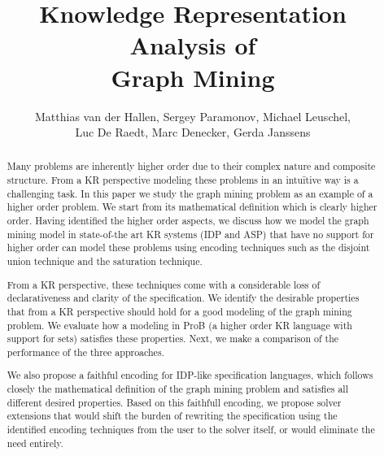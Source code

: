 \documentclass{new_tlp}
\author[]{Matthias van der Hallen, Sergey Paramonov, Michael Leuschel,\\ Luc De Raedt, Marc Denecker, Gerda Janssens}
\title{Knowledge Representation Analysis of\\ Graph Mining}
\begin{document}
\maketitle
\begin{abstract}
Many problems are inherently higher order due to their complex nature and composite structure. 
From a KR perspective modeling these problems in an intu\"itive way is a challenging task. 
In this paper we study the graph mining problem as an example of a higher order problem. 
We start from its mathematical definition which is clearly higher order. 
Having identified the higher order aspects, we discuss how we model the graph mining model 
in state-of-the art KR systems (IDP and ASP) that have no support for higher order can model these problems using encoding techniques such as the disjoint union technique and the saturation technique. 

From a KR perspective, these techniques come with a considerable loss of declarativeness and clarity of the specification. 
We identify the desirable properties that from a KR perspective should hold for a good modeling of the graph mining problem. 
We evaluate how a modeling in ProB (a higher order KR language with support for sets) satisfies these properties. 
Next, we make a comparison of the performance of the three approaches.

We also propose a faithful encoding for IDP-like specification languages, which follows closely the mathematical definition of the graph mining problem and satisfies all different desired properties.
Based on this faithfull encoding,  we propose solver extensions that would shift the burden of rewriting the specification using the identified encoding techniques from the user to the solver itself, or would eliminate the need entirely.



\end{abstract}
\end{document}

